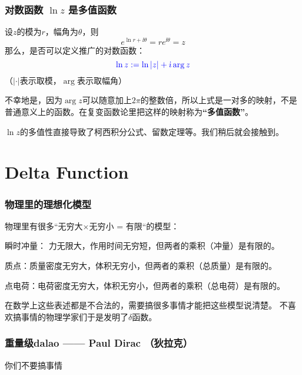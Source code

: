 \documentclass[CJK,13pt]{beamer}
\begin{document}


\begin{frame}
  \frametitle{对数函数 $\ln z$ 是多值函数}
  
  设$z$的模为$r$，幅角为$\theta$，则 
  $$e^{\ln r + \ii \theta} = r e^{\ii\theta} = z$$
  那么，是否可以定义推广的对数函数：
  $${\color{blue} \ln z := \ln |z| + {\dot{\imath}} \arg z}$$
  （$|\cdot|$表示取模，$\arg$表示取幅角）
  
  不幸地是，因为$\arg z$可以随意加上$2\pi$的整数倍，所以上式是一对多的映射，不是普通意义上的函数。在复变函数论里把这样的映射称为{\bf\blue ``多值函数''}。

  \skipline
  
  {\blue $\ln z$的多值性直接导致了柯西积分公式、留数定理等}。我们稍后就会接触到。
\end{frame}

\section{Delta Function}


\begin{frame}
  \frametitle{物理里的理想化模型}
  
  物理里有很多“无穷大$\times$无穷小 = 有限“的模型：
  \bitem
\item{瞬时冲量： 力无限大，作用时间无穷短，但两者的乘积（冲量）是有限的。}
\item{质点：质量密度无穷大，体积无穷小，但两者的乘积（总质量）是有限的。}
\item{点电荷：电荷密度无穷大，体积无穷小，但两者的乘积（总电荷）是有限的。}
  \eitem

  \skiplines
  
  在数学上这些表述都是不合法的，需要搞很多事情才能把这些模型说清楚。 不喜欢搞事情的物理学家们于是发明了{\blue $\delta$函数}。
  
\end{frame}

\begin{frame}
  \frametitle{重量级dalao —— Paul Dirac （狄拉克）}
  
  \bcenter

  你们不要搞事情
  \ecenter
  
\end{frame}
  
\end{document}
